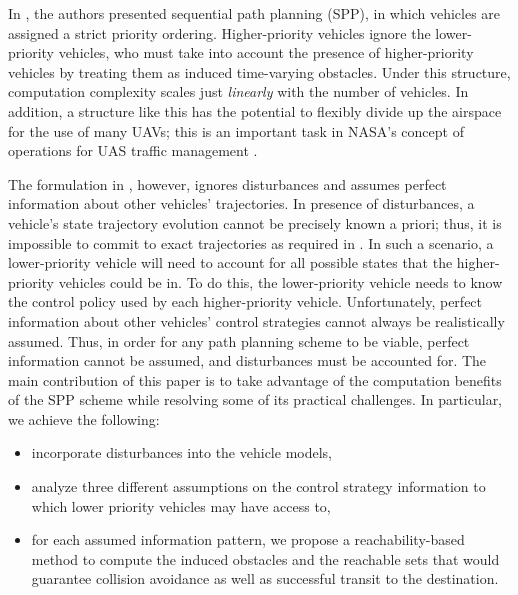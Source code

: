 In \cite{Chen15}, the authors presented sequential path planning (SPP), in which vehicles are assigned a strict priority ordering. Higher-priority vehicles ignore the lower-priority vehicles, who must take into account the presence of higher-priority vehicles by treating them as induced time-varying obstacles. Under this structure, computation complexity scales just \textit{linearly} with the number of vehicles. In addition, a structure like this has the potential to flexibly divide up the airspace for the use of many UAVs; this is an important task in NASA's concept of operations for UAS traffic management \cite{Kopardekar16}. 

The formulation in \cite{Chen15}, however, ignores disturbances and assumes perfect information about other vehicles' trajectories. In presence of disturbances, a vehicle's state trajectory evolution cannot be precisely known a priori; thus, it is impossible to commit to exact trajectories as required in \cite{Chen15}. In such a scenario, a lower-priority vehicle will need to account for all possible states that the higher-priority vehicles could be in. To do this, the lower-priority vehicle needs to know the control policy used by each higher-priority vehicle. Unfortunately, perfect information about other vehicles' control strategies cannot always be realistically assumed. Thus, in order for any path planning scheme to be viable, perfect information cannot be assumed, and disturbances must be accounted for. The main contribution of this paper is to take advantage of the computation benefits of the SPP scheme while resolving some of its practical challenges. In particular, we achieve the following:
\begin{itemize}
\item incorporate disturbances into the vehicle models,
\item analyze three different assumptions on the control strategy information to which lower priority vehicles may have access to,
\item for each assumed information pattern, we propose a reachability-based method to compute the induced obstacles and the reachable sets that would guarantee collision avoidance as well as successful transit to the destination.
\end{itemize}